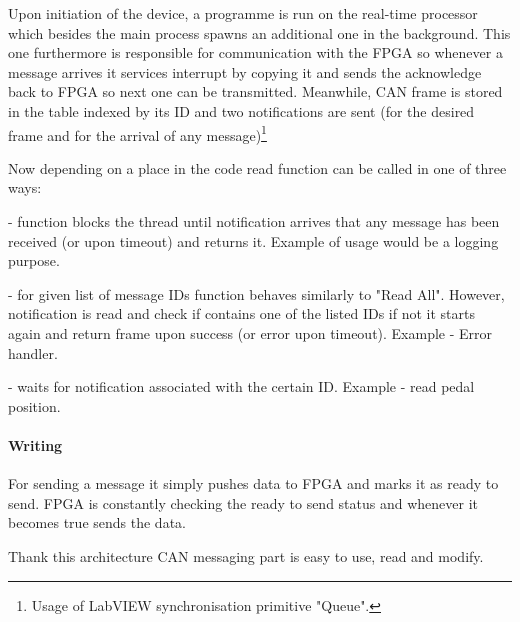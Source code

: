 Upon initiation of the device, a programme is run on the real-time processor which besides the main process spawns an additional one in the background. This one furthermore is responsible for communication with the FPGA so whenever a message arrives it services interrupt by copying it and sends the acknowledge back to FPGA so next one can be transmitted. Meanwhile, CAN frame is stored in the table indexed by its ID and two notifications are sent (for the desired frame and for the arrival of any message)\footnote{Usage of LabVIEW synchronisation primitive "Queue".}%

Now depending on a place in the code read function can be called in one of three ways:
\begin{description}[labelindent=1cm]
    \item[Read All] - function blocks the thread until notification arrives that any message has been received (or upon timeout) and returns it. Example of usage would be a logging purpose.
    \item[Read Some] - for given list of message IDs function behaves similarly to "Read All". However, notification is read and check if contains one of the listed IDs if not it starts again and return frame upon success (or error upon timeout). Example - Error handler.
    \item[Read ID] - waits for notification associated with the certain ID. Example - read pedal position.
    


\end{description}

\paragraph{Writing}
For sending a message it simply pushes data to FPGA and marks it as ready to send. FPGA is constantly checking the ready to send status and whenever it becomes true sends the data.

\vspace{5mm}
\noindent Thank this architecture CAN messaging part is easy to use, read and modify.

